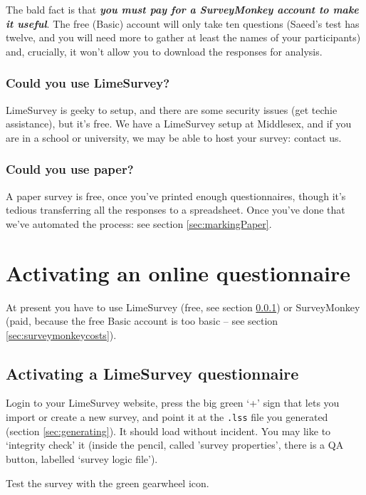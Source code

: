 \documentclass[11pt,a4paper]{article}
\newcommand{\seclabel}[1]{\label{sec:#1}}
\newcommand{\secref}[1]{section \ref{sec:#1}}
\begin{document}
The bald fact is that \textbf{\textit{you must pay for a SurveyMonkey account to make it useful}}. The free (Basic) account will only take ten questions (Saeed's test has twelve, and you will need more to gather at least the names of your participants) and, crucially, it won't allow you to download the responses for analysis. 

\subsubsection{Could you use LimeSurvey?}
\seclabel{LimeSurveycosts}

LimeSurvey is geeky to setup, and there are some security issues (get techie assistance), but it's free. We have a LimeSurvey setup at Middlesex, and if you are in a school or university, we may be able to host your survey: contact us.

\subsubsection{Could you use paper?}
\seclabel{papercosts}

A paper survey is free, once you've printed enough questionnaires, though it's tedious transferring all the responses to a spreadsheet. Once you've done that we've automated the process: see \secref{markingPaper}.

\section{Activating an online questionnaire}

At present you have to use LimeSurvey (free, see \secref{LimeSurveycosts}) or SurveyMonkey (paid, because the free Basic account is too basic -- see \secref{surveymonkeycosts}).

\subsection{Activating a LimeSurvey questionnaire}
\seclabel{runningLimeSurvey}

Login to your LimeSurvey website, press the big green `+' sign that lets you import or create a new survey, and point it at the \texttt{.lss} file you generated (\secref{generating}). It should load without incident. You may like to `integrity check' it (inside the pencil, called 'survey properties', there is a QA button, labelled `survey logic file').

Test the survey with the green gearwheel icon.
\end{document}
